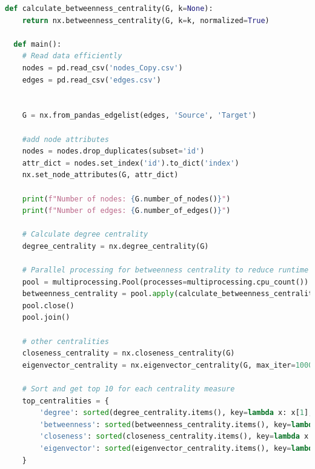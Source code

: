 \documentclass[12pt,a4paper]{article}
\begin{document}
\begin{lstlisting}[language=Python, caption=Python example]
  def calculate_betweenness_centrality(G, k=None):
    return nx.betweenness_centrality(G, k=k, normalized=True)

  def main():
    # Read data efficiently
    nodes = pd.read_csv('nodes_Copy.csv')
    edges = pd.read_csv('edges.csv')

    
    G = nx.from_pandas_edgelist(edges, 'Source', 'Target')

    #add node attributes
    nodes = nodes.drop_duplicates(subset='id')
    attr_dict = nodes.set_index('id').to_dict('index')
    nx.set_node_attributes(G, attr_dict)

    print(f"Number of nodes: {G.number_of_nodes()}")
    print(f"Number of edges: {G.number_of_edges()}")

    # Calculate degree centrality
    degree_centrality = nx.degree_centrality(G)

    # Parallel processing for betweenness centrality to reduce runtime
    pool = multiprocessing.Pool(processes=multiprocessing.cpu_count())
    betweenness_centrality = pool.apply(calculate_betweenness_centrality, args=(G, 1000))
    pool.close()
    pool.join()

    # other centralities
    closeness_centrality = nx.closeness_centrality(G)
    eigenvector_centrality = nx.eigenvector_centrality(G, max_iter=1000)

    # Sort and get top 10 for each centrality measure
    top_centralities = { 
        'degree': sorted(degree_centrality.items(), key=lambda x: x[1], reverse=True)[:10],
        'betweenness': sorted(betweenness_centrality.items(), key=lambda x: x[1], reverse=True)[:10],
        'closeness': sorted(closeness_centrality.items(), key=lambda x: x[1], reverse=True)[:10],
        'eigenvector': sorted(eigenvector_centrality.items(), key=lambda x: x[1], reverse=True)[:10]
    }


  \end{lstlisting}
\end{document}
